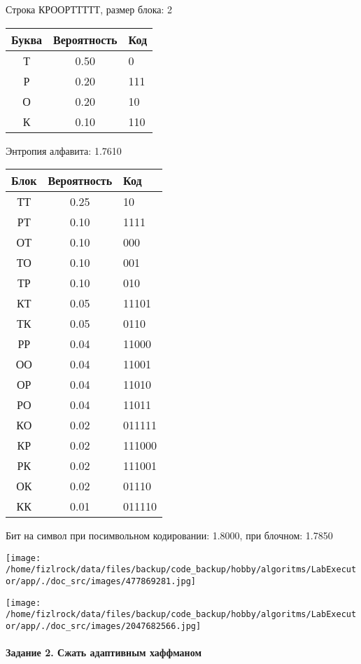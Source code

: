 \documentclass[a4paper, 12pt]{article}
\begin{document}
Строка КРООРТТТТТ, размер блока: 2
\begin{center}
 \begin{tabular}{ |c|c|l| } 
  \hline
     Буква & Вероятность & Код\\ \hline
Т & 0.50 & 0\\\hline
Р & 0.20 & 111\\\hline
О & 0.20 & 10\\\hline
К & 0.10 & 110
\\ \hline \end{tabular}
\end{center}
Энтропия алфавита: 1.7610
\begin{center}
 \begin{tabular}{ |c|c|l| } 
  \hline
     Блок & Вероятность & Код\\ \hline
ТТ & 0.25 & 10\\\hline
РТ & 0.10 & 1111\\\hline
ОТ & 0.10 & 000\\\hline
ТО & 0.10 & 001\\\hline
ТР & 0.10 & 010\\\hline
КТ & 0.05 & 11101\\\hline
ТК & 0.05 & 0110\\\hline
РР & 0.04 & 11000\\\hline
ОО & 0.04 & 11001\\\hline
ОР & 0.04 & 11010\\\hline
РО & 0.04 & 11011\\\hline
КО & 0.02 & 011111\\\hline
КР & 0.02 & 111000\\\hline
РК & 0.02 & 111001\\\hline
ОК & 0.02 & 01110\\\hline
КК & 0.01 & 011110
\\ \hline \end{tabular}
\end{center}
Бит на символ при посимвольном кодировании: 1.8000, при блочном: 1.7850

\texttt{[image: /home/fizlrock/data/files/backup/code\_backup/hobby/algoritms/LabExecutor/app/./doc\_src/images/477869281.jpg]}

\texttt{[image: /home/fizlrock/data/files/backup/code\_backup/hobby/algoritms/LabExecutor/app/./doc\_src/images/2047682566.jpg]}
\pagebreak
\paragraph{Задание 2. Сжать адаптивным хаффманом\\}
\end{document}
